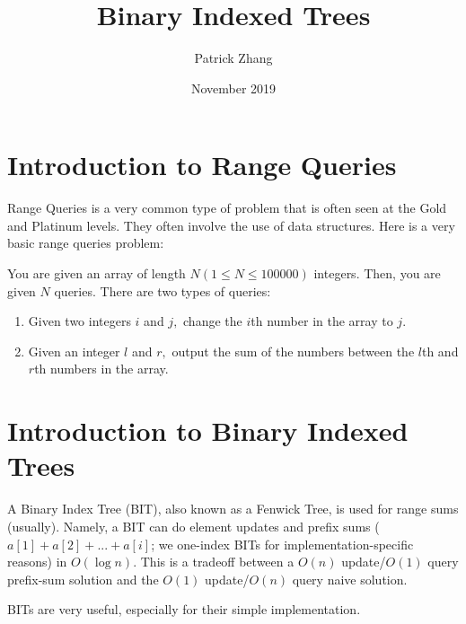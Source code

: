\documentclass{article}
\title{Binary Indexed Trees}
\author{Patrick Zhang}
\date{November 2019}
\begin{document}
\maketitle

\section{Introduction to Range Queries}
    Range Queries is a very common type of problem that is often seen at the Gold and Platinum levels. They often involve the use of data structures. Here is a very basic range queries problem:
    
    You are given an array of length $N (1 \leq N \leq 100000)$ integers. Then, you are given $N$ queries. There are two types of queries:
    \begin{enumerate}
        \item Given two integers $i$ and $j,$ change the $i$th number in the array to $j.$
        \item Given an integer $l$ and $r,$ output the sum of the numbers between the $l$th and $r$th numbers in the array.
    \end{enumerate}

\section{Introduction to Binary Indexed Trees}
    A Binary Index Tree (BIT), also known as a Fenwick Tree, is used for range sums (usually). Namely, a BIT can do element updates and prefix sums ($a[1]+a[2]+ ... +a[i]$; we one-index BITs for implementation-specific reasons) in $O(\log n)$. This is a tradeoff between a $O(n)$ update/$O(1)$ query prefix-sum solution and the $O(1)$ update/$O(n)$ query naive solution.
    
    BITs are very useful, especially for their simple implementation.
    
\end{document}
